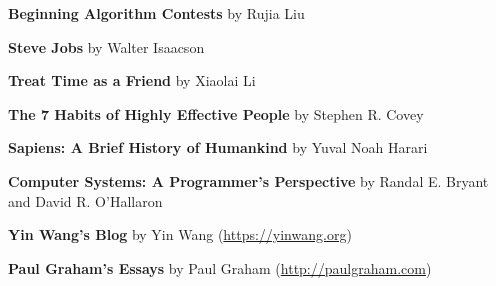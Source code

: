 
\begin{cvitems}

  \item \textbf{Beginning Algorithm Contests} by Rujia Liu
  \item \textbf{Steve Jobs} by Walter Isaacson
  \item \textbf{Treat Time as a Friend} by Xiaolai Li
  \item \textbf{The 7 Habits of Highly Effective People} by Stephen R. Covey
  \item \textbf{Sapiens: A Brief History of Humankind} by Yuval Noah Harari
  \item \textbf{Computer Systems: A Programmer's Perspective} by Randal E. Bryant and David R. O'Hallaron
  \item \textbf{Yin Wang's Blog} by Yin Wang (\url{https://yinwang.org})
  \item \textbf{Paul Graham's Essays} by Paul Graham (\url{http://paulgraham.com})

\end{cvitems}

